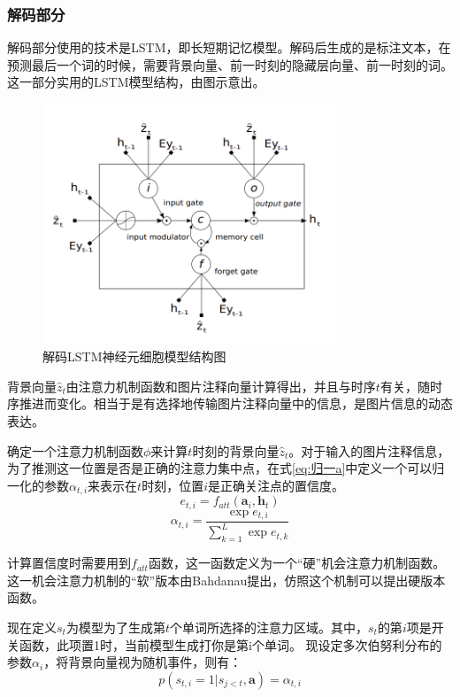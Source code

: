\subsubsection{解码部分}
解码部分使用的技术是LSTM，即长短期记忆模型。解码后生成的是标注文本，在预测最后一个词的时候，需要背景向量、前一时刻的隐藏层向量、前一时刻的词。这一部分实用的LSTM模型结构，由图示意出。
\begin{figure}[!htbp]
    \centering
    \includegraphics[width=0.8\textwidth]{figures/lstm_token.png}
    \caption{解码LSTM神经元细胞模型结构图}
    \label{fig:lstm_tokenize}
\end{figure}

背景向量$\hat{z}_t$由注意力机制函数和图片注释向量计算得出，并且与时序$t$有关，随时序推进而变化。相当于是有选择地传输图片注释向量中的信息，是图片信息的动态表达。

确定一个注意力机制函数$\phi$来计算$t$时刻的背景向量$\hat{z}_t$。对于输入的图片注释信息，为了推测这一位置是否是正确的注意力集中点，在式\eqref{eq:归一a}中定义一个可以归一化的参数$\alpha_{t,i}$来表示在$t$时刻，位置$i$是正确关注点的置信度。
\begin{equation}
    e_{t,i}=f_{att}(\textbf{a}_i,\textbf{h}_t)
\end{equation}
\begin{equation}
    \label{eq:归一a}
    \alpha_{t,i}=\frac{\exp e_{t,i}}{\sum_{k=1}^{L}\exp e_{t,k}}
\end{equation}

计算置信度时需要用到$f_{att}$函数，这一函数定义为一个“硬”机会注意力机制函数。
这一机会注意力机制的“软”版本由Bahdanau提出，仿照这个机制可以提出硬版本函数。

现在定义$s_t$为模型为了生成第$t$个单词所选择的注意力区域。其中，$s_t$的第$i$项是开关函数，此项置1时，当前模型生成打你是第i个单词。
现设定多次伯努利分布的参数${\alpha_i}$，将背景向量视为随机事件，则有：
\begin{equation}
    p(s_{t,i} = 1|s_{j<t}, \textbf{a}) = \alpha_{t,i}
\end{equation}

